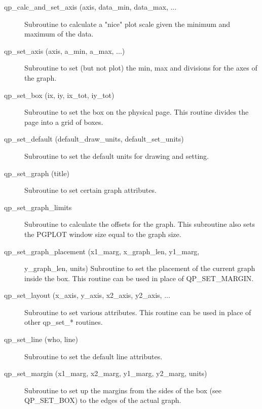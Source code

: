 \begin{description}

\item[qp_calc_and_set_axis (axis, data_min, data_max, ... ] \Newline
     Subroutine to calculate a "nice" plot scale given the minimum and maximum
     of the data. 

\item[qp_set_axis (axis, a_min, a_max, ...)] \Newline
    Subroutine to set (but not plot) the min, max and divisions for the axes of the graph.

\item[qp_set_box (ix, iy, ix_tot, iy_tot) ] \Newline 
     Subroutine to set the box on the physical page.
     This routine divides the page into a grid of boxes. 

\item[qp_set_default (default_draw_units, default_set_units)] \Newline 
     Subroutine to set the default units for drawing and setting.

\item[qp_set_graph (title)] \Newline 
     Subroutine to set certain graph attributes.

\item[qp_set_graph_limits] \Newline 
     Subroutine to calculate the offsets for the graph.
     This subroutine also sets the PGPLOT window size equal to the graph size.

\item[qp_set_graph_placement (x1_marg, x_graph_len, y1_marg, ] \Newline 
                                                       y_graph_len, units)
Subroutine to set the placement of the current graph inside the box. 
This routine can be used in place of QP_SET_MARGIN.

\item[qp_set_layout (x_axis, y_axis, x2_axis, y2_axis, ...] \Newline 
     Subroutine to set various attributes. This routine can be used
     in place of other qp_set_* routines.

\item[qp_set_line (who, line)] \Newline 
     Subroutine to set the default line attributes.

\item[qp_set_margin (x1_marg, x2_marg, y1_marg, y2_marg, units)] \Newline 
Subroutine to set up the margins from the sides of the box (see QP_SET_BOX)
to the edges of the actual graph.


\end{description}
